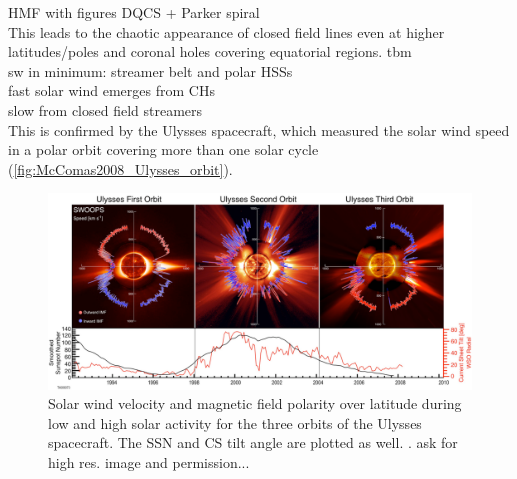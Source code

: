 HMF with figures DQCS + Parker spiral\\

This leads to the chaotic appearance of closed field lines even at higher latitudes/poles and coronal holes covering equatorial regions. tbm\\

sw in minimum: streamer belt and polar HSSs\\

fast solar wind emerges from CHs\\

slow from closed field streamers\\

This is confirmed by the Ulysses spacecraft, which measured the solar wind speed in a polar orbit covering more than one solar cycle (\autoref{fig:McComas2008_Ulysses_orbit}).\\
\begin{figure}[htb]
	\centering
	\includegraphics[width=\textwidth]{images/McComas2008_Ulysses_orbit_.png}
	\caption{Solar wind velocity and magnetic field polarity over latitude during low and high solar activity for the three orbits of the Ulysses spacecraft. The SSN and CS tilt angle are plotted as well. \citep[Fig.~1]{McComas2008}. ask for high res. image and permission...}
	\label{fig:McComas2008_Ulysses_orbit}
\end{figure}

